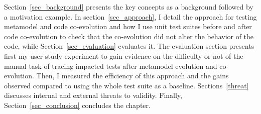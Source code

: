 Section~\ref{sec_background} presents the key concepts as a background followed by a motivation example. 
In section~\ref{sec_approach}, I detail the approach for testing metamodel and code co-evolution and how I use unit test suites before and after code co-evolution to check that the co-evolution did not alter the behavior of the code, while Section~\ref{sec_evaluation} evaluates it. The evaluation section presents first my user study experiment to gain evidence on the difficulty or not of the manual task of tracing impacted tests after metamodel evolution and co-evolution. Then, I measured the efficiency of this approach and the gains observed compared to using the whole test suite as a baseline.
Sections~\ref{threat} discusses internal and external threats to validity. 
Finally, Section~\ref{sec_conclusion} concludes the chapter. 
%


%


